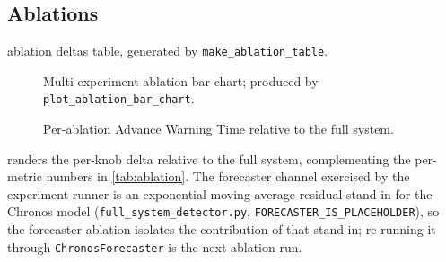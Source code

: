\subsection{Ablations}
\label{sec:results:ablations}

\begin{table}[tbp]
  \centering
  \caption{Per-knob ablation deltas relative to the full system.
  Generated by \texttt{make\_ablation\_table}.}
  \label{tab:ablation}
    {ablation deltas table, generated by \texttt{make\_ablation\_table}.}
\end{table}

\begin{figure}[tbp]
  \centering
    {Multi-experiment ablation bar chart; produced by
    \texttt{plot\_ablation\_bar\_chart}.}
  \caption{Per-ablation Advance Warning Time relative to the full
  system.}
  \label{fig:ablation-bar}
\end{figure}

 renders the per-knob \awt{} delta relative to
the full system, complementing the per-metric numbers in
\cref{tab:ablation}. The forecaster channel exercised by the experiment
runner is an exponential-moving-average residual stand-in for the
Chronos model (\texttt{full\_system\_detector.py},
\texttt{FORECASTER\_IS\_PLACEHOLDER}), so the forecaster ablation
isolates the contribution of that stand-in; re-running it through
\texttt{ChronosForecaster} is the next ablation run.
